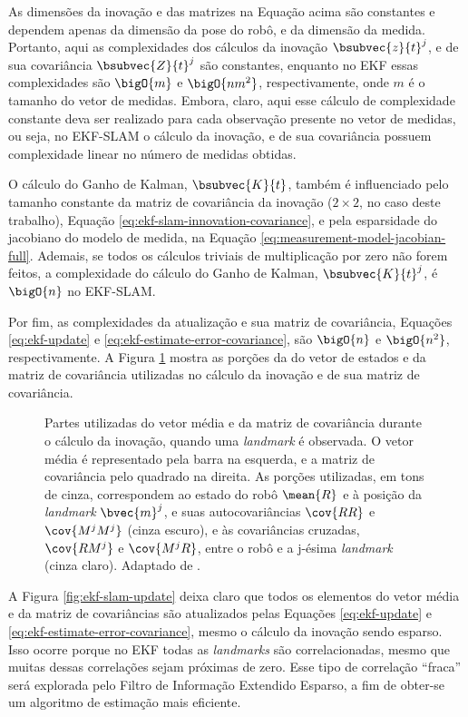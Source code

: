 \renewcommand{\arraystretch}{1.0}
As dimensões da inovação e das matrizes na Equação acima são constantes e dependem apenas da dimensão da pose do robô, e da dimensão da medida. 
Portanto, aqui as complexidades dos cálculos da inovação $\bsubvec{z}{t}^j$, e de sua covariância $\bsubvec{Z}{t}^j$ são constantes, enquanto no EKF essas complexidades são $\bigO{m}$ e $\bigO{nm^2}$, respectivamente, onde $m$ é o tamanho do vetor de medidas. Embora, claro, aqui esse cálculo de complexidade constante deva ser realizado para cada observação presente no vetor de medidas, ou seja, no EKF-SLAM o cálculo da
inovação, e de sua covariância possuem complexidade linear no número de medidas obtidas.

O cálculo do Ganho de Kalman, $\bsubvec{K}{t}$, também é influenciado pelo 
tamanho constante da matriz de covariância da inovação ($2\times 2$, no caso deste trabalho), Equação \ref{eq:ekf-slam-innovation-covariance}, e pela esparsidade do jacobiano do modelo de medida, na Equação \ref{eq:measurement-model-jacobian-full}. Ademais, se todos os cálculos triviais de multiplicação por zero não forem feitos, a complexidade do cálculo do Ganho de Kalman, $\bsubvec{K}{t}^j$, é $\bigO{n}$ no EKF-SLAM.

Por fim, as complexidades da atualização e sua matriz de covariância, Equações \ref{eq:ekf-update} e \ref{eq:ekf-estimate-error-covariance}, são $\bigO{n}$ e $\bigO{n^2}$, respectivamente. A Figura \ref{fig:ekf-slam-innovation} mostra as porções da 
do vetor de estados e da matriz de covariância utilizadas no cálculo da inovação e de sua matriz de covariância.

\begin{figure}[h]
  \centering
  
  \caption{Partes utilizadas do vetor média e da matriz de covariância durante o cálculo da inovação, quando uma \textit{landmark} é observada. O vetor média é representado pela barra na esquerda, e a matriz de covariância pelo quadrado na direita. As porções utilizadas, em tons de cinza, correspondem ao estado do robô $\mean{R}$ e à posição da \textit{landmark} $\bvec{m}^j$, e suas autocovariâncias $\cov{RR}$ e $\cov{M^j M^j}$ (cinza escuro), e às covariâncias cruzadas, $\cov{RM^j}$ e $\cov{M^jR}$, entre o robô e a j-ésima \textit{landmark} (cinza claro). Adaptado de \cite[p.~8]{jsola}.}
  \label{fig:ekf-slam-innovation}
\end{figure}

A Figura \ref{fig:ekf-slam-update} deixa claro que todos os elementos do vetor média e da 
matriz de covariâncias são atualizados pelas Equações \ref{eq:ekf-update} e \ref{eq:ekf-estimate-error-covariance}, mesmo o cálculo da inovação sendo esparso. Isso ocorre porque no EKF todas as \textit{landmarks} são 
correlacionadas, mesmo que muitas dessas correlações sejam próximas de zero. 
Esse tipo de correlação ``fraca'' será explorada pelo Filtro de Informação Extendido Esparso, a fim de obter-se um algoritmo de estimação mais eficiente.

